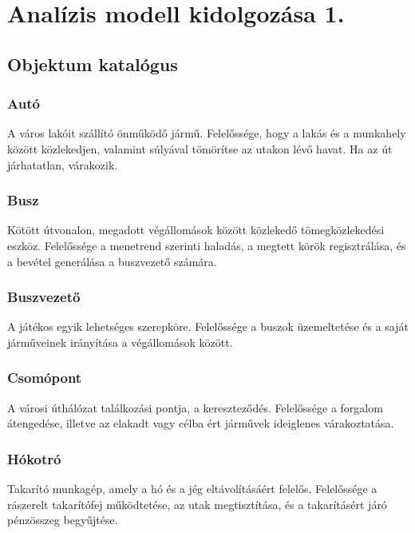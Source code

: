 \chapter{Analízis modell kidolgozása 1.}


\section{Objektum katalógus}

\subsection{Autó}
\par{A város lakóit szállító önműködő jármű. Felelőssége, hogy a lakás és a munkahely között közlekedjen, valamint súlyával tömörítse az utakon lévő havat. Ha az út járhatatlan, várakozik.}

\subsection{Busz}
\par{Kötött útvonalon, megadott végállomások között közlekedő tömegközlekedési eszköz. Felelőssége a menetrend szerinti haladás, a megtett körök regisztrálása, és a bevétel generálása a buszvezető számára.}

\subsection{Buszvezető}
\par{A játékos egyik lehetséges szerepköre. Felelőssége a buszok üzemeltetése és a saját járműveinek irányítása a végállomások között.}

\subsection{Csomópont}
\par{A városi úthálózat találkozási pontja, a kereszteződés. Felelőssége a forgalom átengedése, illetve az elakadt vagy célba ért járművek ideiglenes várakoztatása.}

\subsection{Hókotró}
\par{Takarító munkagép, amely a hó és a jég eltávolításáért felelős. Felelőssége a rászerelt takarítófej működtetése, az utak megtisztítása, és a takarításért járó pénzösszeg begyűjtése.}

